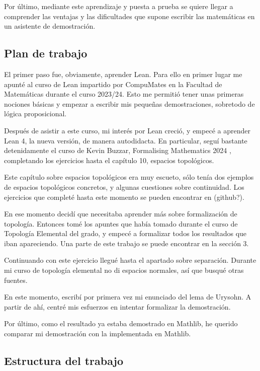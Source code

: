 Por último, mediante este aprendizaje y puesta a prueba se quiere llegar a comprender las ventajas y las dificultades que supone escribir las matemáticas en un asistente de demostración.

\subsection{Plan de trabajo}

El primer paso fue, obviamente, aprender Lean. Para ello en primer lugar me apunté al curso de Lean impartido por CompuMates en la Facultad de Matemáticas durante el curso 2023/24. Esto me permitió tener unas primeras nociones básicas y empezar a escribir mis pequeñas demostraciones, sobretodo de lógica proposicional.

Después de asistir a este curso, mi interés por Lean creció, y empecé a aprender Lean 4, la nueva versión, de manera autodidacta. En particular, seguí bastante detenidamente el curso de Kevin Buzzar, Formalising Mathematics 2024 \cite{buzzar2024formalising}, completando los ejercicios hasta el capítulo 10, espacios topológicos.

Este capítulo sobre espacios topológicos era muy escueto, sólo tenía dos ejemplos de espacios topológicos concretos, y algunas cuestiones sobre continuidad. Los ejercicios que completé hasta este momento se pueden encontrar en (github?).

En ese momento decidí que necesitaba aprender más sobre formalización de topología. Entonces tomé los apuntes que había tomado durante el curso de Topología Elemental del grado, y empecé a formalizar todos los resultados que iban apareciendo. Una parte de este trabajo se puede encontrar en la sección 3.

Continuando con este ejercicio llegué hasta el apartado sobre separación. Durante mi curso de topología elemental no di espacios normales, así que busqué otras fuentes.

En este momento, escribí por primera vez mi enunciado del lema de Urysohn. A partir de ahí, centré mis esfuerzos en intentar formalizar la demostración.

Por último, como el resultado ya estaba demostrado en Mathlib, he querido comparar mi demostración con la implementada en Mathlib.


\subsection{Estructura del trabajo}

